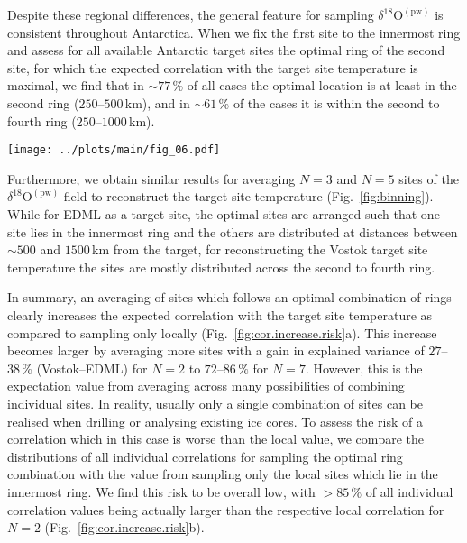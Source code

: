 \documentclass[cp, manuscript]{copernicus}
\begin{document}
Despite these regional differences, the general feature for sampling
$\delta^{18}\mathrm{O}^{\mathrm{(pw)}}$ is consistent throughout
Antarctica. When we fix the first site to the innermost ring and assess for all
available Antarctic target sites the optimal ring of the second site, for which
the expected correlation with the target site temperature is maximal, we find
that in $\sim77\,\%$ of all cases the optimal location is at least in the second
ring ($250$--$500$\,km), and in $\sim61\,\%$ of the cases it is within the
second to fourth ring ($250$--$1000$\,km).

\begin{figure*}[t]%
\centering
\texttt{[image: ../plots/main/fig\_06.pdf]}
\caption{%
  The optimal arrangement for averaging three or five
  $\delta^{18}\mathrm{O}^{\mathrm{(pw)}}$ ice cores to reconstruct the target
  site temperature at the EDML (\textbf{a}, \textbf{c}) and Vostok (\textbf{b},
  \textbf{d}) drilling sites. Displayed are the optimal five of all possible
  combinations of rings, i.e. those which exhibit the highest mean
  correlation across $10^5$ random trials of averaging $N=3$ (\textbf{c},
  \textbf{d}) or $N=5$ (\textbf{a}, \textbf{b}) grid cells from these rings.}
\label{fig:binning}%
\end{figure*}%

Furthermore, we obtain similar results for averaging $N=3$ and $N=5$ sites of
the $\delta^{18}\mathrm{O}^{\mathrm{(pw)}}$ field to reconstruct the target site
temperature (Fig.~\ref{fig:binning}). While for EDML as a target site, the
optimal sites are arranged such that one site lies in the innermost ring and the
others are distributed at distances between $\sim500$ and $1500$\,km from the
target, for reconstructing the Vostok target site temperature the sites are
mostly distributed across the second to fourth ring.

In summary, an averaging of sites which follows an optimal combination of
rings clearly increases the expected correlation with the target site
temperature as compared to sampling only locally
(Fig.~\ref{fig:cor.increase.risk}a). This increase becomes larger by averaging
more sites with a gain in explained variance of $27$--$38\,\%$ (Vostok--EDML)
for $N=2$ to $72$--$86\,\%$ for $N=7$. However, this is the expectation value
from averaging across many possibilities of combining individual sites. In
reality, usually only a single combination of sites can be realised when
drilling or analysing existing ice cores. To assess the risk of a correlation
which in this case is worse than the local value, we compare the distributions
of all individual correlations for sampling the optimal ring combination with
the value from sampling only the local sites which lie in the innermost ring. We
find this risk to be overall low, with $>85\,\%$ of all individual correlation
values being actually larger than the respective local correlation for $N=2$
(Fig.~\ref{fig:cor.increase.risk}b).
\end{document}
